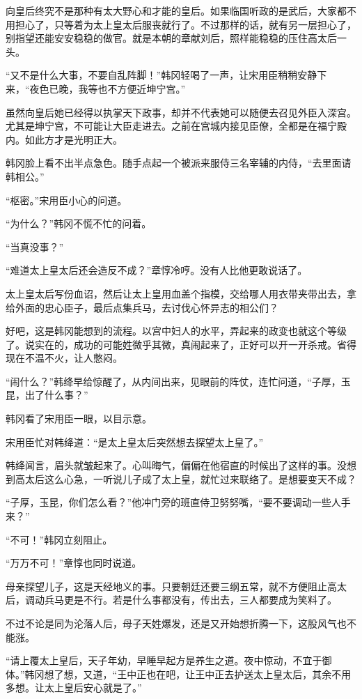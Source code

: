 向皇后终究不是那种有太大野心和才能的皇后。如果临国听政的是武后，大家都不用担心了，只等着为太上皇太后服丧就行了。不过那样的话，就有另一层担心了，别指望还能安安稳稳的做官。就是本朝的章献刘后，照样能稳稳的压住高太后一头。

“又不是什么大事，不要自乱阵脚！”韩冈轻喝了一声，让宋用臣稍稍安静下来，“夜色已晚，我等也不方便近坤宁宫。”

虽然向皇后她已经得以执掌天下政事，却并不代表她可以随便去召见外臣入深宫。尤其是坤宁宫，不可能让大臣走进去。之前在宫城内接见臣僚，全都是在福宁殿内。如此方才是光明正大。

韩冈脸上看不出半点急色。随手点起一个被派来服侍三名宰辅的内侍，“去里面请韩相公。”

“枢密。”宋用臣小心的问道。

“为什么？”韩冈不慌不忙的问着。

“当真没事？”

“难道太上皇太后还会造反不成？”章惇冷哼。没有人比他更敢说话了。

太上皇太后写份血诏，然后让太上皇用血盖个指模，交给哪人用衣带夹带出去，拿给外面的忠心臣子，最后点集兵马，去讨伐心怀异志的相公们？

好吧，这是韩冈能想到的流程。以宫中妇人的水平，弄起来的政变也就这个等级了。说实在的，成功的可能姓微乎其微，真闹起来了，正好可以开一开杀戒。省得现在不温不火，让人憋闷。

“闹什么？”韩绛早给惊醒了，从内间出来，见眼前的阵仗，连忙问道，“子厚，玉昆，出了什么事？”

韩冈看了宋用臣一眼，以目示意。

宋用臣忙对韩绛道：“是太上皇太后突然想去探望太上皇了。”

韩绛闻言，眉头就皱起来了。心叫晦气，偏偏在他宿直的时候出了这样的事。没想到高太后这么心急，一听说儿子成了太上皇，就忙过来联络了。是想要变天不成？

“子厚，玉昆，你们怎么看？”他冲门旁的班直侍卫努努嘴，“要不要调动一些人手来？”

“不可！”韩冈立刻阻止。

“万万不可！”章惇也同时说道。

母亲探望儿子，这是天经地义的事。只要朝廷还要三纲五常，就不方便阻止高太后，调动兵马更是不行。若是什么事都没有，传出去，三人都要成为笑料了。

不过不论是同为沦落人后，母子天姓爆发，还是又开始想折腾一下，这股风气也不能涨。

“请上覆太上皇后，天子年幼，早睡早起方是养生之道。夜中惊动，不宜于御体。”韩冈想了想，又道，“王中正也在吧，让王中正去护送太上皇太后，其余不用多想。让太上皇后安心就是了。”

